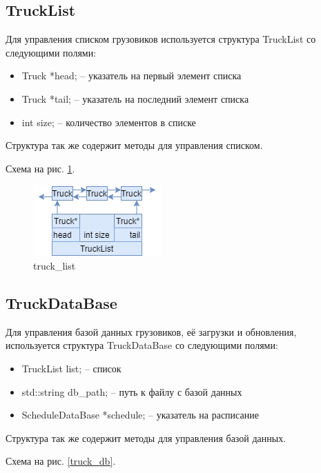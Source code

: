 \subsection{TruckList}

Для управления списком грузовиков используется структура TruckList со следующими полями:

\begin{itemize}
    \item Truck *head; -- указатель на первый элемент списка
    \item Truck *tail; -- указатель на последний элемент списка
    \item int size; -- количество элементов в списке
\end{itemize}

Структура так же содержит методы для управления списком.

Схема на рис. \ref{truck_list}.

\begin{figure}[hpt!]
    \centering
    \includegraphics[width=0.4\linewidth]{photo/data_structures/truck_list}
    \caption{truck\_list}
    \label{truck_list}
\end{figure}

\subsection{TruckDataBase}

Для управления базой данных грузовиков, 
её загрузки и обновления, 
используется структура TruckDataBase со следующими полями: 

\begin{itemize}
    \item TruckList list{}; -- список
    \item std::string db\_path{}; -- путь к файлу с базой данных
    \item ScheduleDataBase *schedule{}; -- указатель на расписание
\end{itemize}

Структура так же содержит методы для управления базой данных.

Схема на рис. \ref{truck_db}.

